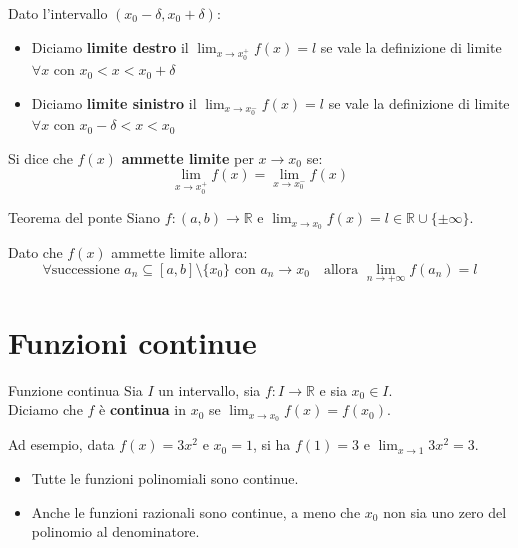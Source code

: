 \documentclass[12pt]{report}
\newcommand{\R}{\mathbb{R}}
\begin{document}
	Dato l'intervallo $(x_0 - \delta, x_0 + \delta)$:
	
	\begin{itemize}
		
		\item Diciamo \textbf{limite destro} il $\lim_{x \to x_0^+} f(x) = l$ se vale la definizione di limite $\forall x$ con $x_0 < x < x_0 + \delta$
		
		\item Diciamo \textbf{limite sinistro} il $\lim_{x \to x_0^-} f(x) = l$ se vale la definizione di limite $\forall x$ con $x_0 - \delta < x < x_0$
		
	\end{itemize}
	
	Si dice che $f(x)$ \textbf{ammette limite} per $x \to x_0$ se:
	\[
		\lim_{x \to x_0^+} f(x) = \lim_{x \to x_0^-} f(x)
	\]
	
	\begin{teorema}{Teorema del ponte}{}
		Siano $f: (a, b) \to \R$ e $\lim_{x \to x_0} f(x) = l \in \R \cup \{\pm\infty\}$.
		
		\smallbreak
		Dato che $f(x)$ ammette limite allora:
		\[
			\forall \text{successione } a_n \subseteq [a, b] \setminus \{x_0\} \text{ con } a_n \to x_0 \quad \text{allora } \lim_{n \to +\infty} f(a_n) = l
		\]
		
	\end{teorema}
	
	\chapter{Funzioni continue}
	
	\begin{definizione}{Funzione continua}{}
		Sia $I$ un intervallo, sia $f: I \to \R$ e sia $x_0 \in I$.\\
		Diciamo che $f$ è \textbf{continua} in $x_0$ se $\lim_{x \to x_0} f(x) = f(x_0)$.
	\end{definizione}
	
	Ad esempio, data $f(x) = 3x^2$ e $x_0 = 1$, si ha $f(1) = 3$ e $\lim_{x \to 1} 3x^2 = 3$.
	
	\begin{osservazione}{}{}
		
		\begin{itemize}
			
			\item Tutte le funzioni polinomiali sono continue.
			
			\item Anche le funzioni razionali sono continue, a meno che $x_0$ non sia uno zero del polinomio al denominatore.
			
		\end{itemize}
		
	\end{osservazione}
	
\end{document}
